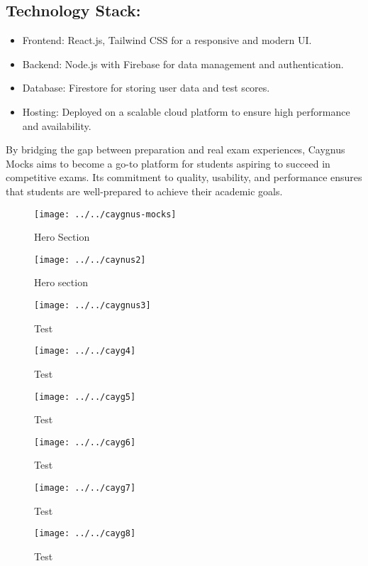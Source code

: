 \subsection*{Technology Stack:}
\begin{itemize}
\item Frontend: React.js, Tailwind CSS for a responsive and modern UI.
\item Backend: Node.js with Firebase for data management and authentication.
\item Database: Firestore for storing user data and test scores.
\item Hosting: Deployed on a scalable cloud platform to ensure high performance and availability.
\end{itemize}
By bridging the gap between preparation and real exam experiences, Caygnus Mocks aims to become a go-to platform for students aspiring to succeed in competitive exams. Its commitment to quality, usability, and performance ensures that students are well-prepared to achieve their academic goals.
\begin{figure}[tbph]
	\centering
	\texttt{[image: ../../caygnus-mocks]}
	\caption{Hero Section}
	\label{fig:caygnus-mocks}
\end{figure}
\newpage
\begin{figure}[tbph]
	\centering
	\texttt{[image: ../../caynus2]}
	\caption{Hero section}
	\label{fig:caynus2}
\end{figure}
\begin{figure}[tbph]
	\centering
	\texttt{[image: ../../caygnus3]}
	\caption{Test}
	\label{fig:caygnus3}
\end{figure}
\begin{figure}[tbph]
	\centering
	\texttt{[image: ../../cayg4]}
	\caption{Test}
	\label{fig:cayg4}
\end{figure}
\begin{figure}[tbph]
	\centering
	\texttt{[image: ../../cayg5]}
	\caption{Test}
	\label{fig:cayg5}
\end{figure}
\begin{figure}[tbph]
	\centering
	\texttt{[image: ../../cayg6]}
	\caption{Test}
	\label{fig:cayg6}
\end{figure}
\begin{figure}[tbph]
	\centering
	\texttt{[image: ../../cayg7]}
	\caption{Test}
	\label{fig:cayg7}
\end{figure}
\newpage
\begin{figure}[tbph]
	\centering
	\texttt{[image: ../../cayg8]}
	\caption{Test}
	\label{fig:cayg8}
\end{figure}







